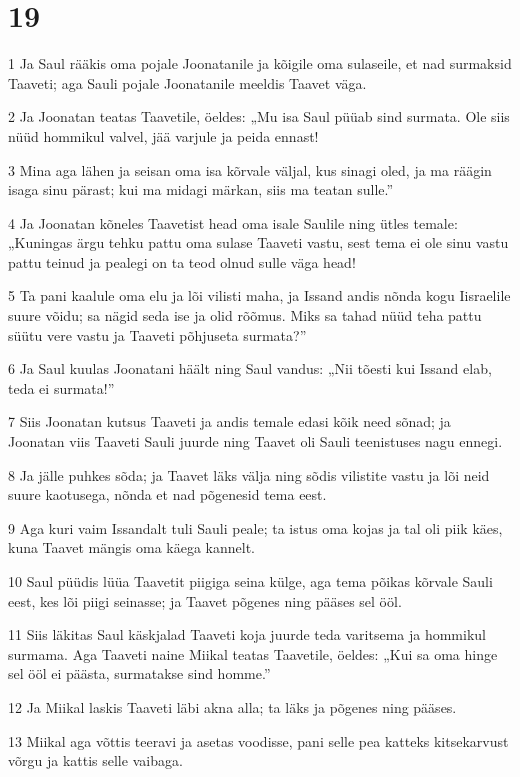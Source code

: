 \chapter{19}

\par 1 Ja Saul rääkis oma pojale Joonatanile ja kõigile oma sulaseile, et nad surmaksid Taaveti; aga Sauli pojale Joonatanile meeldis Taavet väga.
\par 2 Ja Joonatan teatas Taavetile, öeldes: „Mu isa Saul püüab sind surmata. Ole siis nüüd hommikul valvel, jää varjule ja peida ennast!
\par 3 Mina aga lähen ja seisan oma isa kõrvale väljal, kus sinagi oled, ja ma räägin isaga sinu pärast; kui ma midagi märkan, siis ma teatan sulle.”
\par 4 Ja Joonatan kõneles Taavetist head oma isale Saulile ning ütles temale: „Kuningas ärgu tehku pattu oma sulase Taaveti vastu, sest tema ei ole sinu vastu pattu teinud ja pealegi on ta teod olnud sulle väga head!
\par 5 Ta pani kaalule oma elu ja lõi vilisti maha, ja Issand andis nõnda kogu Iisraelile suure võidu; sa nägid seda ise ja olid rõõmus. Miks sa tahad nüüd teha pattu süütu vere vastu ja Taaveti põhjuseta surmata?”
\par 6 Ja Saul kuulas Joonatani häält ning Saul vandus: „Nii tõesti kui Issand elab, teda ei surmata!”
\par 7 Siis Joonatan kutsus Taaveti ja andis temale edasi kõik need sõnad; ja Joonatan viis Taaveti Sauli juurde ning Taavet oli Sauli teenistuses nagu ennegi.
\par 8 Ja jälle puhkes sõda; ja Taavet läks välja ning sõdis vilistite vastu ja lõi neid suure kaotusega, nõnda et nad põgenesid tema eest.
\par 9 Aga kuri vaim Issandalt tuli Sauli peale; ta istus oma kojas ja tal oli piik käes, kuna Taavet mängis oma käega kannelt.
\par 10 Saul püüdis lüüa Taavetit piigiga seina külge, aga tema põikas kõrvale Sauli eest, kes lõi piigi seinasse; ja Taavet põgenes ning pääses sel ööl.
\par 11 Siis läkitas Saul käskjalad Taaveti koja juurde teda varitsema ja hommikul surmama. Aga Taaveti naine Miikal teatas Taavetile, öeldes: „Kui sa oma hinge sel ööl ei päästa, surmatakse sind homme.”
\par 12 Ja Miikal laskis Taaveti läbi akna alla; ta läks ja põgenes ning pääses.
\par 13 Miikal aga võttis teeravi ja asetas voodisse, pani selle pea katteks kitsekarvust võrgu ja kattis selle vaibaga.

